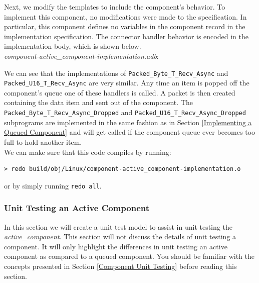 Next, we modify the templates to include the component's behavior. To implement this component, no modifications were made to the specification. In particular, this component defines no variables in the component record in the implementation specification. The connector handler behavior is encoded in the implementation body, which is shown below. \\

\textit{component-active\_component-implementation.adb}:

We can see that the implementations of \texttt{Packed\_Byte\_T\_Recv\_Async} and \texttt{Packed\_U16\_T\_Recv\_Async} are very similar. Any time an item is popped off the component's queue one of these handlers is called. A packet is then created containing the data item and sent out of the component. The \texttt{Packed\_Byte\_T\_Recv\_Async\_Dropped} and \texttt{Packed\_U16\_T\_Recv\_Async\_Dropped} subprograms are implemented in the same fashion as in Section \ref{Implementing a Queued Component} and will get called if the component queue ever becomes too full to hold another item. \\

We can make sure that this code compiles by running:

\vspace{5mm} %
\begin{verbatim}
> redo build/obj/Linux/component-active_component-implementation.o
\end{verbatim}
\vspace{5mm} %

or by simply running \texttt{redo all}. \\

\subsubsection{Unit Testing an Active Component}

In this section we will create a unit test model to assist in unit testing the \textit{active\_component}. This section will not discuss the details of unit testing a component. It will only highlight the differences in unit testing an active component as compared to a queued component. You should be familiar with the concepts presented in Section \ref{Component Unit Testing} before reading this section. \\

